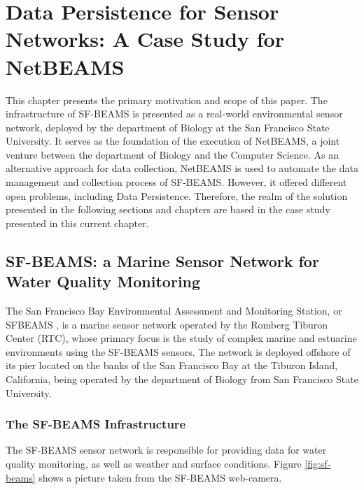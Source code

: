 

\chapter{Data Persistence for Sensor Networks: A Case Study for NetBEAMS}
\label{chap:netbeams-overview}

This chapter presents the primary motivation and scope of this paper. The
infrastructure of SF-BEAMS is presented as a real-world environmental sensor
network, deployed by the department of Biology at the San Francisco State
University. It serves as the foundation of the execution of NetBEAMS, a joint
venture between the department of Biology and the Computer Science. As an
alternative approach for data collection, NetBEAMS is used to automate the data
management and collection process of SF-BEAMS. However, it offered different
open problems, including Data Persistence. Therefore, the realm of the solution
presented in the following sections and chapters are based in the case study
presented in this current chapter.

\section{SF-BEAMS: a Marine Sensor Network for Water Quality Monitoring}

The San Francisco Bay Environmental Assessment and Monitoring Station, or
SFBEAMS \cite{sfbeams2006}, is a marine sensor network operated by the Romberg Tiburon
Center (RTC), whose primary focus is the study of complex marine and estuarine
environments using the SF-BEAMS sensors. The network is deployed offshore of
its pier located on the banks of the San Francisco Bay at the Tiburon Island,
California, being operated by the department of Biology from San Francisco
State University.

\subsection{The SF-BEAMS Infrastructure}

The SF-BEAMS sensor network is responsible for providing data for water quality
monitoring, as well as weather and surface conditions. Figure
\ref{fig:sf-beams} shows a picture taken from the SF-BEAMS web-camera.

